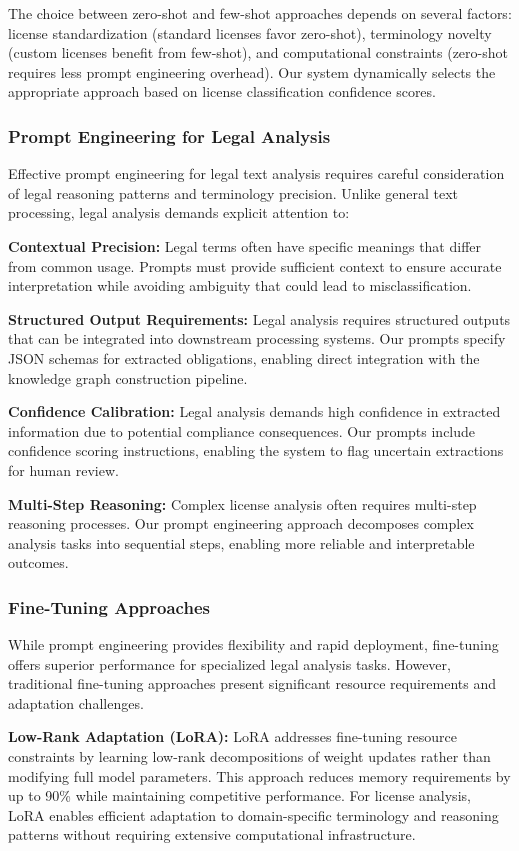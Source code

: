 \documentclass[9pt,twocolumn]{article}
\begin{document}
The choice between zero-shot and few-shot approaches depends on several factors: license standardization (standard licenses favor zero-shot), terminology novelty (custom licenses benefit from few-shot), and computational constraints (zero-shot requires less prompt engineering overhead). Our system dynamically selects the appropriate approach based on license classification confidence scores.

\subsubsection{Prompt Engineering for Legal Analysis}
Effective prompt engineering for legal text analysis requires careful consideration of legal reasoning patterns and terminology precision. Unlike general text processing, legal analysis demands explicit attention to:

\textbf{Contextual Precision:} Legal terms often have specific meanings that differ from common usage. Prompts must provide sufficient context to ensure accurate interpretation while avoiding ambiguity that could lead to misclassification.

\textbf{Structured Output Requirements:} Legal analysis requires structured outputs that can be integrated into downstream processing systems. Our prompts specify JSON schemas for extracted obligations, enabling direct integration with the knowledge graph construction pipeline.

\textbf{Confidence Calibration:} Legal analysis demands high confidence in extracted information due to potential compliance consequences. Our prompts include confidence scoring instructions, enabling the system to flag uncertain extractions for human review.

\textbf{Multi-Step Reasoning:} Complex license analysis often requires multi-step reasoning processes. Our prompt engineering approach decomposes complex analysis tasks into sequential steps, enabling more reliable and interpretable outcomes.

\subsubsection{Fine-Tuning Approaches}
While prompt engineering provides flexibility and rapid deployment, fine-tuning offers superior performance for specialized legal analysis tasks. However, traditional fine-tuning approaches present significant resource requirements and adaptation challenges.

\textbf{Low-Rank Adaptation (LoRA):} LoRA addresses fine-tuning resource constraints by learning low-rank decompositions of weight updates rather than modifying full model parameters. This approach reduces memory requirements by up to 90\% while maintaining competitive performance. For license analysis, LoRA enables efficient adaptation to domain-specific terminology and reasoning patterns without requiring extensive computational infrastructure.
\end{document}
